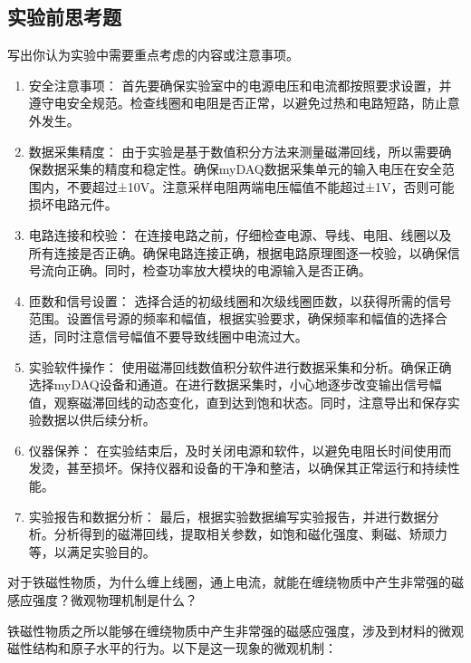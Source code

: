 \documentclass[dvipsnames, svgnames,a4paper,11pt]{article}
\begin{document}
	\subsection{实验前思考题}
	\begin{question}
		写出你认为实验中需要重点考虑的内容或注意事项。
	\end{question}
	\begin{enumerate}
		\item 安全注意事项： 首先要确保实验室中的电源电压和电流都按照要求设置，并遵守电安全规范。检查线圈和电阻是否正常，以避免过热和电路短路，防止意外发生。
		
		\item 数据采集精度： 由于实验是基于数值积分方法来测量磁滞回线，所以需要确保数据采集的精度和稳定性。确保myDAQ数据采集单元的输入电压在安全范围内，不要超过±10V。注意采样电阻两端电压幅值不能超过±1V，否则可能损坏电路元件。
		
		\item 电路连接和校验： 在连接电路之前，仔细检查电源、导线、电阻、线圈以及所有连接是否正确。确保电路连接正确，根据电路原理图逐一校验，以确保信号流向正确。同时，检查功率放大模块的电源输入是否正确。
		
		\item 匝数和信号设置： 选择合适的初级线圈和次级线圈匝数，以获得所需的信号范围。设置信号源的频率和幅值，根据实验要求，确保频率和幅值的选择合适，同时注意信号幅值不要导致线圈中电流过大。
		
		\item 实验软件操作： 使用磁滞回线数值积分软件进行数据采集和分析。确保正确选择myDAQ设备和通道。在进行数据采集时，小心地逐步改变输出信号幅值，观察磁滞回线的动态变化，直到达到饱和状态。同时，注意导出和保存实验数据以供后续分析。
		
		\item 仪器保养： 在实验结束后，及时关闭电源和软件，以避免电阻长时间使用而发烫，甚至损坏。保持仪器和设备的干净和整洁，以确保其正常运行和持续性能。
		
		\item 实验报告和数据分析： 最后，根据实验数据编写实验报告，并进行数据分析。分析得到的磁滞回线，提取相关参数，如饱和磁化强度、剩磁、矫顽力等，以满足实验目的。
	\end{enumerate}
	
	\begin{question}
		对于铁磁性物质，为什么缠上线圈，通上电流，就能在缠绕物质中产生非常强的磁感应强度？微观物理机制是什么？
	\end{question}
	铁磁性物质之所以能够在缠绕物质中产生非常强的磁感应强度，涉及到材料的微观磁性结构和原子水平的行为。以下是这一现象的微观机制：
	
\end{document}
